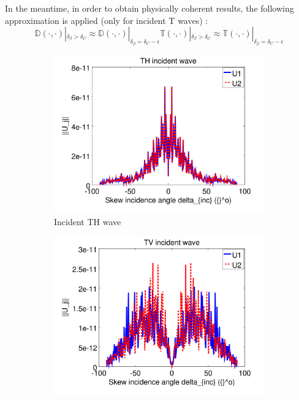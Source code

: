 In the meantime, in order to obtain physically coherent results, the following approximation is applied (only for incident T waves) :
\begin{subequations}
\begin{equation}
\mathbb{D}(\cdot,\cdot)|_{\delta_{\beta}>\delta_C} \approx \mathbb{D}(\cdot,\cdot)|_{\delta_{\beta}=\delta_C-\epsilon}
\end{equation}
\begin{equation}
\mathbb{T}(\cdot,\cdot)|_{\delta_{\beta}>\delta_C} \approx \mathbb{T}(\cdot,\cdot)|_{\delta_{\beta}=\delta_C-\epsilon}
\end{equation}
\label{const_reg_approx}
\end{subequations}

\begin{figure}
\centering
\begin{subfigure}[b]{0.45\textwidth}
        \includegraphics[width=\textwidth]{images/chapter4/const_reg/U1TH_180_50.png}
        \caption{Incident TH wave}
        \label{const_reg:U1TH}
    \end{subfigure}
   \begin{subfigure}[b]{0.45\textwidth}
        \includegraphics[width=\textwidth]{images/chapter4/const_reg/U1TV_180_50.png}

\end{subfigure}
\end{figure}
